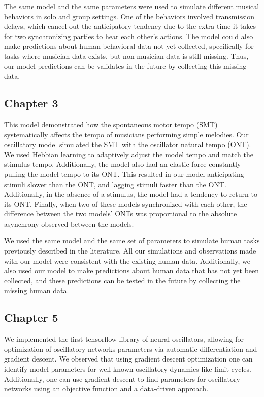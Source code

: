 \documentclass{report}
\begin{document}
The same model and the same parameters were used to simulate different musical behaviors in solo and group settings. One of the behaviors involved transmission delays, which cancel out the anticipatory tendency due to the extra time it takes for two synchronizing parties to hear each other's actions. The model could also make predictions about human behavioral data not yet collected, specifically for tasks where musician data exists, but non-musician data is still missing. Thus, our model predictions can be validates in the future by collecting this missing data.

\subsection{Chapter 3}
This model demonstrated how the spontaneous motor tempo (SMT) systematically affects the tempo of musicians performing simple melodies. Our oscillatory model simulated the SMT with the oscillator natural tempo (ONT). We used Hebbian learning to adaptively adjust the model tempo and match the stimulus tempo. Additionally, the model also had an elastic force constantly pulling the model tempo to its ONT. This resulted in our model anticipating stimuli slower than the ONT, and lagging stimuli faster than the ONT. Additionally, in the absence of a stimulus, the model had a tendency to return to its ONT. Finally, when two of these models synchronized with each other, the difference between the two models' ONTs was proportional to the absolute asynchrony observed between the models.

We used the same model and the same set of parameters to simulate human tasks previously described in the literature. All our simulations and observations made with our model were consistent with the existing human data. Additionally, we also used our model to make predictions about human data that has not yet been collected, and these predictions can be tested in the future by collecting the missing human data.
    
\subsection{Chapter 5}
We implemented the first tensorflow library of neural oscillators, allowing for optimization of oscillatory networks parameters via automatic differentiation and gradient descent. We observed that using gradient descent optimization one can identify model parameters for well-known oscillatory dynamics like limit-cycles. Additionally, one can use gradient descent to find parameters for oscillatory networks using an objective function and a data-driven approach.
\end{document}
